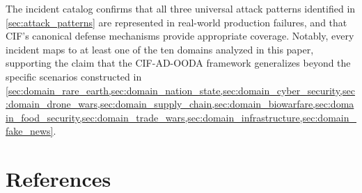 \documentclass[
]{article}
\begin{document}
The incident catalog confirms that all three universal attack patterns
identified in \cref{sec:attack_patterns} are represented in real-world
production failures, and that CIF's canonical defense mechanisms provide
appropriate coverage. Notably, every incident maps to at least one of
the ten domains analyzed in this paper, supporting the claim that the
CIF-AD-OODA framework generalizes beyond the specific scenarios
constructed in
\cref{sec:domain_rare_earth,sec:domain_nation_state,sec:domain_cyber_security,sec:domain_drone_wars,sec:domain_supply_chain,sec:domain_biowarfare,sec:domain_food_security,sec:domain_trade_wars,sec:domain_infrastructure,sec:domain_fake_news}.

\newpage

\section{References}\label{references}

\clearpage


\end{document}
